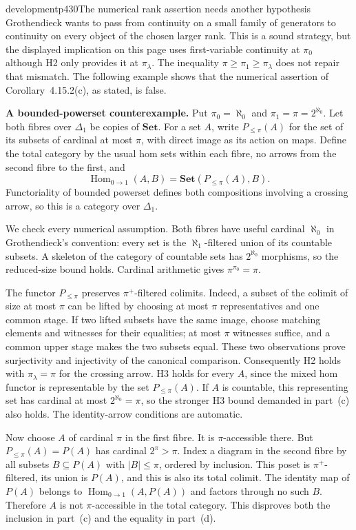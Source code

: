 \begin{dcomment}{development}{p430}{The numerical rank assertion needs another hypothesis}
Grothendieck wants to pass from continuity on a small family of generators to continuity on every object of the chosen larger rank. This is a sound strategy, but the displayed implication on this page uses first-variable continuity at $\pi_0$ although H2 only provides it at $\pi_\lambda$. The inequality $\pi\geq\pi_1\geq\pi_\lambda$ does not repair that mismatch. The following example shows that the numerical assertion of Corollary~4.15.2(c), as stated, is false.

\textbf{A bounded-powerset counterexample.}\ours\quad
Put $\pi_0=\aleph_0$ and $\pi_1=\pi=2^{\aleph_0}$. Let both fibres over $\Delta_1$ be copies of $\mathbf{Set}$. For a set $A$, write $P_{\leq\pi}(A)$ for the set of its subsets of cardinal at most $\pi$, with direct image as its action on maps. Define the total category by the usual hom sets within each fibre, no arrows from the second fibre to the first, and
\[
 \operatorname{Hom}_{0\to1}(A,B)
       =\mathbf{Set}(P_{\leq\pi}(A),B).
\]
Functoriality of bounded powerset defines both compositions involving a crossing arrow, so this is a category over $\Delta_1$.

We check every numerical assumption. Both fibres have useful cardinal $\aleph_0$ in Grothendieck's convention: every set is the $\aleph_1$-filtered union of its countable subsets. A skeleton of the category of countable sets has $2^{\aleph_0}$ morphisms, so the reduced-size bound holds. Cardinal arithmetic gives $\pi^{\pi_0}=\pi$.

The functor $P_{\leq\pi}$ preserves $\pi^+$-filtered colimits. Indeed, a subset of the colimit of size at most $\pi$ can be lifted by choosing at most $\pi$ representatives and one common stage. If two lifted subsets have the same image, choose matching elements and witnesses for their equalities; at most $\pi$ witnesses suffice, and a common upper stage makes the two subsets equal. These two observations prove surjectivity and injectivity of the canonical comparison. Consequently H2 holds with $\pi_\lambda=\pi$ for the crossing arrow. H3 holds for every $A$, since the mixed hom functor is representable by the set $P_{\leq\pi}(A)$. If $A$ is countable, this representing set has cardinal at most $2^{\aleph_0}=\pi$, so the stronger H3 bound demanded in part~(c) also holds. The identity-arrow conditions are automatic.

Now choose $A$ of cardinal $\pi$ in the first fibre. It is $\pi$-accessible there. But $P_{\leq\pi}(A)=P(A)$ has cardinal $2^\pi>\pi$. Index a diagram in the second fibre by all subsets $B\subseteq P(A)$ with $|B|\leq\pi$, ordered by inclusion. This poset is $\pi^+$-filtered, its union is $P(A)$, and this is also its total colimit. The identity map of $P(A)$ belongs to $\operatorname{Hom}_{0\to1}(A,P(A))$ and factors through no such $B$. Therefore $A$ is not $\pi$-accessible in the total category. This disproves both the inclusion in part~(c) and the equality in part~(d).\par


\end{dcomment}
